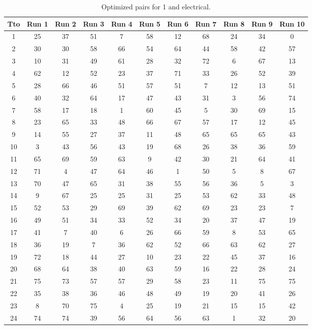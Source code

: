 \begin{table}
  \centering
  \scriptsize
  \caption{Optimized pairs for 1 and electrical.}
  \label{tab_pairs}
\begin{tabular}{c c c c c c c c c c c }
\hline
Tto & Run 1 & Run 2 & Run 3 & Run 4 & Run 5 & Run 6 & Run 7 & Run 8 & Run 9 & Run 10 \\
\hline
1 & 25 & 37 & 51 & 7 & 58 & 12 & 68 & 24 & 34 & 0 \\
2 & 30 & 30 & 58 & 66 & 54 & 64 & 44 & 58 & 42 & 57 \\
3 & 10 & 31 & 49 & 61 & 28 & 32 & 72 & 6 & 67 & 13 \\
4 & 62 & 12 & 52 & 23 & 37 & 71 & 33 & 26 & 52 & 39 \\
5 & 28 & 66 & 46 & 51 & 57 & 51 & 7 & 12 & 13 & 51 \\
6 & 40 & 32 & 64 & 17 & 47 & 43 & 31 & 3 & 56 & 74 \\
7 & 58 & 17 & 18 & 1 & 60 & 45 & 5 & 30 & 69 & 15 \\
8 & 23 & 65 & 33 & 48 & 66 & 67 & 57 & 17 & 12 & 45 \\
9 & 14 & 55 & 27 & 37 & 11 & 48 & 65 & 65 & 65 & 43 \\
10 & 3 & 43 & 56 & 43 & 19 & 68 & 26 & 38 & 36 & 59 \\
11 & 65 & 69 & 59 & 63 & 9 & 42 & 30 & 21 & 64 & 41 \\
12 & 71 & 4 & 47 & 64 & 46 & 1 & 50 & 5 & 8 & 67 \\
13 & 70 & 47 & 65 & 31 & 38 & 55 & 56 & 36 & 5 & 3 \\
14 & 9 & 67 & 25 & 25 & 31 & 25 & 53 & 62 & 33 & 48 \\
15 & 52 & 53 & 29 & 69 & 39 & 62 & 69 & 23 & 23 & 7 \\
16 & 49 & 51 & 34 & 33 & 52 & 34 & 20 & 37 & 47 & 19 \\
17 & 41 & 7 & 40 & 6 & 26 & 66 & 59 & 8 & 53 & 65 \\
18 & 36 & 19 & 7 & 36 & 62 & 52 & 66 & 63 & 62 & 27 \\
19 & 72 & 18 & 44 & 27 & 10 & 23 & 22 & 45 & 37 & 16 \\
20 & 68 & 64 & 38 & 40 & 63 & 59 & 16 & 22 & 28 & 24 \\
21 & 75 & 73 & 57 & 57 & 29 & 58 & 23 & 11 & 75 & 75 \\
22 & 35 & 38 & 36 & 46 & 48 & 49 & 19 & 20 & 41 & 26 \\
23 & 8 & 70 & 75 & 4 & 25 & 19 & 21 & 15 & 15 & 42 \\
24 & 74 & 74 & 39 & 56 & 64 & 56 & 63 & 1 & 32 & 20 \\

\end{tabular}
\end{table}
